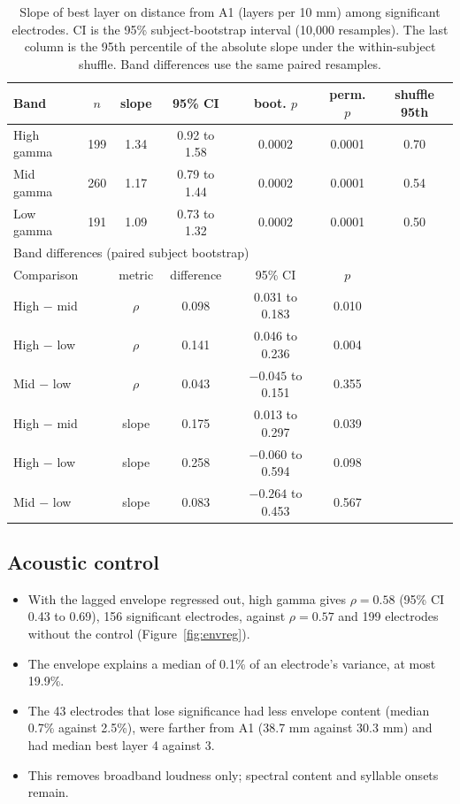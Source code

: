 \documentclass[11pt]{article}
\begin{document}
\begin{table}[H]
\centering\small\setlength{\tabcolsep}{4pt}
\caption{Slope of best layer on distance from A1 (layers per 10 mm) among significant electrodes. CI is the 95\% subject-bootstrap interval (10,000 resamples). The last column is the 95th percentile of the absolute slope under the within-subject shuffle. Band differences use the same paired resamples.}
\label{tab:slope}
\begin{tabular}{lcccccc}
\toprule
Band & $n$ & slope & 95\% CI & boot. $p$ & perm. $p$ & shuffle 95th \\
\midrule
High gamma & 199 & 1.34 & 0.92 to 1.58 & 0.0002 & 0.0001 & 0.70 \\
Mid gamma  & 260 & 1.17 & 0.79 to 1.44 & 0.0002 & 0.0001 & 0.54 \\
Low gamma  & 191 & 1.09 & 0.73 to 1.32 & 0.0002 & 0.0001 & 0.50 \\
\midrule
\multicolumn{7}{l}{Band differences (paired subject bootstrap)} \\
\midrule
\multicolumn{2}{l}{Comparison} & metric & difference & 95\% CI & $p$ & \\
\midrule
\multicolumn{2}{l}{High $-$ mid} & $\rho$ & 0.098 & 0.031 to 0.183 & 0.010 & \\
\multicolumn{2}{l}{High $-$ low} & $\rho$ & 0.141 & 0.046 to 0.236 & 0.004 & \\
\multicolumn{2}{l}{Mid $-$ low} & $\rho$ & 0.043 & $-0.045$ to 0.151 & 0.355 & \\
\multicolumn{2}{l}{High $-$ mid} & slope & 0.175 & 0.013 to 0.297 & 0.039 & \\
\multicolumn{2}{l}{High $-$ low} & slope & 0.258 & $-0.060$ to 0.594 & 0.098 & \\
\multicolumn{2}{l}{Mid $-$ low} & slope & 0.083 & $-0.264$ to 0.453 & 0.567 & \\
\bottomrule
\end{tabular}
\end{table}

\subsection{Acoustic control}
\begin{itemize}
  \item With the lagged envelope regressed out, high gamma gives $\rho = 0.58$ (95\% CI 0.43 to 0.69), 156 significant electrodes, against $\rho = 0.57$ and 199 electrodes without the control (Figure~\ref{fig:envreg}).
  \item The envelope explains a median of 0.1\% of an electrode's variance, at most 19.9\%.
  \item The 43 electrodes that lose significance had less envelope content (median 0.7\% against 2.5\%), were farther from A1 (38.7 mm against 30.3 mm) and had median best layer 4 against 3.
  \item This removes broadband loudness only; spectral content and syllable onsets remain.
\end{itemize}
\end{document}
